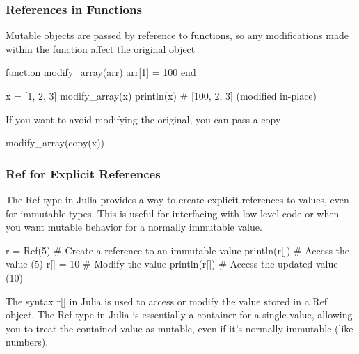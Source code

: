 \documentclass{report}
\begin{document}
     \subsubsection{References in Functions}
     \bigbreak \noindent 
     Mutable objects are passed by reference to functions, so any modifications made within the function affect the original object
     \bigbreak \noindent 
     \begin{jlcode}
         function modify_array(arr)
             arr[1] = 100
         end

         x = [1, 2, 3]
         modify_array(x)
         println(x)  # [100, 2, 3] (modified in-place)
     \end{jlcode}
     \bigbreak \noindent 
     If you want to avoid modifying the original, you can pass a copy
     \bigbreak \noindent 
     \begin{jlcode}
     modify_array(copy(x))
     \end{jlcode}

     \bigbreak \noindent 
     \subsubsection{Ref for Explicit References}
     \bigbreak \noindent 
     The Ref type in Julia provides a way to create explicit references to values, even for immutable types. This is useful for interfacing with low-level code or when you want mutable behavior for a normally immutable value.
     \bigbreak \noindent 
     \begin{jlcode}
         r = Ref(5)  # Create a reference to an immutable value
         println(r[])  # Access the value (5)
         r[] = 10     # Modify the value
         println(r[])  # Access the updated value (10)
     \end{jlcode}
     \bigbreak \noindent 
     The syntax r[] in Julia is used to access or modify the value stored in a Ref object. The Ref type in Julia is essentially a container for a single value, allowing you to treat the contained value as mutable, even if it's normally immutable (like numbers).


     \pagebreak 
     \bigbreak \noindent 
\end{document}

